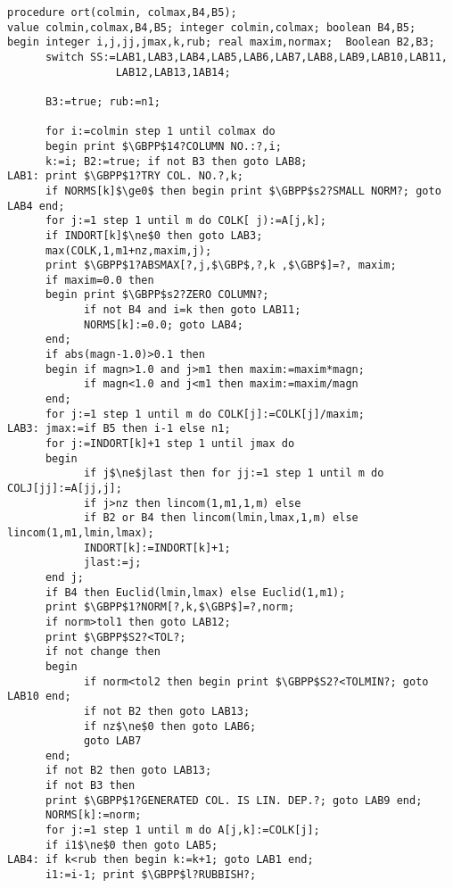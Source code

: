 \begin{lstlisting}[mathescape]
procedure ort(colmin, colmax,B4,B5);
value colmin,colmax,B4,B5; integer colmin,colmax; boolean B4,B5;
begin integer i,j,jj,jmax,k,rub; real maxim,normax;  Boolean B2,B3;
      switch SS:=LAB1,LAB3,LAB4,LAB5,LAB6,LAB7,LAB8,LAB9,LAB10,LAB11,
                 LAB12,LAB13,1AB14;

      B3:=true; rub:=n1;

      for i:=colmin step 1 until colmax do
      begin print $\GBPP$14?COLUMN NO.:?,i;
      k:=i; B2:=true; if not B3 then goto LAB8;
LAB1: print $\GBPP$1?TRY COL. NO.?,k;
      if NORMS[k]$\ge0$ then begin print $\GBPP$s2?SMALL NORM?; goto LAB4 end;
      for j:=1 step 1 until m do COLK[ j):=A[j,k];
      if INDORT[k]$\ne$0 then goto LAB3;
      max(COLK,1,m1+nz,maxim,j);
      print $\GBPP$1?ABSMAX[?,j,$\GBP$,?,k ,$\GBP$]=?, maxim;
      if maxim=0.0 then
      begin print $\GBPP$s2?ZERO COLUMN?;
            if not B4 and i=k then goto LAB11;
            NORMS[k]:=0.0; goto LAB4;
      end;
      if abs(magn-1.0)>0.1 then
      begin if magn>1.0 and j>m1 then maxim:=maxim*magn;
            if magn<1.0 and j<m1 then maxim:=maxim/magn
      end;
      for j:=1 step 1 until m do COLK[j]:=COLK[j]/maxim;
LAB3: jmax:=if B5 then i-1 else n1;
      for j:=INDORT[k]+1 step 1 until jmax do
      begin
            if j$\ne$jlast then for jj:=1 step 1 until m do COLJ[jj]:=A[jj,j];
            if j>nz then lincom(1,m1,1,m) else
            if B2 or B4 then lincom(lmin,lmax,1,m) else lincom(1,m1,lmin,lmax);
            INDORT[k]:=INDORT[k]+1;
            jlast:=j;
      end j;
      if B4 then Euclid(lmin,lmax) else Euclid(1,m1);
      print $\GBPP$1?NORM[?,k,$\GBP$]=?,norm;
      if norm>tol1 then goto LAB12;
      print $\GBPP$S2?<TOL?;
      if not change then
      begin
            if norm<tol2 then begin print $\GBPP$S2?<TOLMIN?; goto LAB10 end;
            if not B2 then goto LAB13;
            if nz$\ne$0 then goto LAB6;
            goto LAB7
      end;
      if not B2 then goto LAB13;
      if not B3 then
      print $\GBPP$1?GENERATED COL. IS LIN. DEP.?; goto LAB9 end;
      NORMS[k]:=norm;
      for j:=1 step 1 until m do A[j,k]:=COLK[j];
      if i1$\ne$0 then goto LAB5;
LAB4: if k<rub then begin k:=k+1; goto LAB1 end;
      i1:=i-1; print $\GBPP$l?RUBBISH?;
\end{lstlisting}

